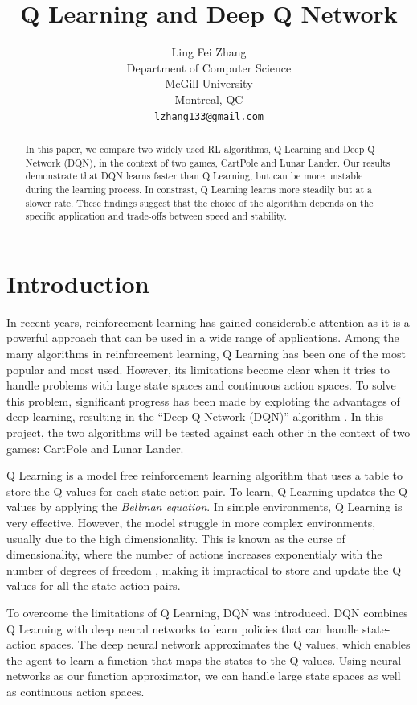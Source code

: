 \documentclass{article}
\title{Q Learning and Deep Q Network}
\author{%
      Ling Fei Zhang\\
      Department of Computer Science\\ McGill University\\ Montreal, QC \\
      \texttt{lzhang133@gmail.com} \\
}
\begin{document}
\maketitle

\begin{abstract}
      In this paper, we compare two widely used RL algorithms, Q Learning and Deep Q Network (DQN), in the context of two games, CartPole and Lunar Lander. Our results demonstrate that DQN learns faster than Q Learning, but can be more unstable during the learning process. In constrast, Q Learning learns more steadily but at a slower rate. These findings suggest that the choice of the algorithm depends on the specific application and trade-offs between speed and stability.
\end{abstract}

\section{Introduction}

In recent years, reinforcement learning has gained considerable attention as it
is a powerful approach that can be used in a wide range of applications. Among
the many algorithms in reinforcement learning, Q Learning has been one of the
most popular and most used. However, its limitations become clear when it tries
to handle problems with large state spaces and continuous action spaces. To
solve this problem, significant progress has been made by exploting the
advantages of deep learning, resulting in the ``Deep Q Network (DQN)''
algorithm \cite{DBLP:journals/corr/MnihKSGAWR13}. In this project, the two
algorithms will be tested against each other in the context of two games:
CartPole and Lunar Lander.

Q Learning is a model free reinforcement learning algorithm that uses a table
to store the Q values for each state-action pair. To learn, Q Learning updates
the Q values by applying the \emph{Bellman equation}. In simple environments, Q
Learning is very effective. However, the model struggle in more complex
environments, usually due to the high dimensionality. This is known as the
curse of dimensionality, where the number of actions increases exponentialy
with the number of degrees of freedom \cite{soft_update}, making it impractical
to store and update the Q values for all the state-action pairs.

To overcome the limitations of Q Learning, DQN was introduced. DQN combines Q
Learning with deep neural networks to learn policies that can handle
state-action spaces. The deep neural network approximates the Q values, which
enables the agent to learn a function that maps the states to the Q values.
Using neural networks as our function approximator, we can handle large state
spaces as well as continuous action spaces.
\end{document}
